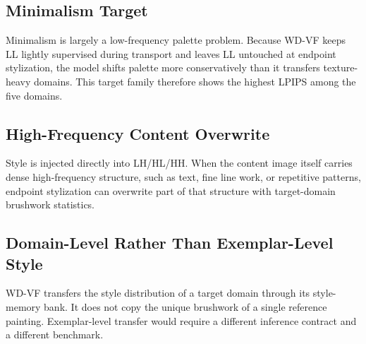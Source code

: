 \documentclass[10pt,letterpaper]{article}
\begin{document}
\subsection{Minimalism Target}
\label{sec:minimalism}

Minimalism is largely a low-frequency palette problem. Because WD-VF keeps LL lightly supervised during transport and leaves LL untouched at endpoint stylization, the model shifts palette more conservatively than it transfers texture-heavy domains. This target family therefore shows the highest LPIPS among the five domains.

\subsection{High-Frequency Content Overwrite}
\label{sec:hf_overwrite}

Style is injected directly into LH/HL/HH. When the content image itself carries dense high-frequency structure, such as text, fine line work, or repetitive patterns, endpoint stylization can overwrite part of that structure with target-domain brushwork statistics.

\subsection{Domain-Level Rather Than Exemplar-Level Style}
\label{sec:domain_level}

WD-VF transfers the style distribution of a target domain through its style-memory bank. It does not copy the unique brushwork of a single reference painting. Exemplar-level transfer would require a different inference contract and a different benchmark.
\end{document}

